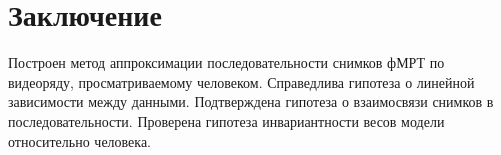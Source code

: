 \documentclass[a4paper, 12pt]{article}
\begin{document}
\newpage

\section{Заключение}

	Построен метод аппроксимации последовательности снимков фМРТ по видеоряду,
	просматриваемому человеком.
	Справедлива гипотеза о линейной зависимости между данными.
	Подтверждена гипотеза о взаимосвязи снимков в последовательности.
	Проверена гипотеза инвариантности весов модели относительно человека.

\newpage



\end{document}
